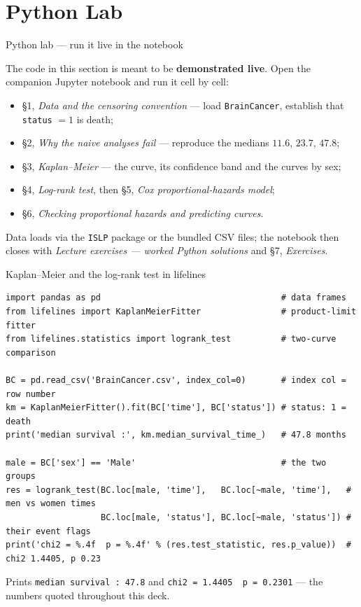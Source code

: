 \documentclass[aspectratio=169,11pt]{beamer}
\begin{document}
\section{Python Lab}

\begin{frame}{Python lab --- run it live in the notebook}
  \begin{labnote}
    The code in this section is meant to be \textbf{demonstrated live}. Open the companion
    Jupyter notebook and run it cell by cell:
    \begin{itemize}
      \item \S1, \emph{Data and the censoring convention} --- load \texttt{BrainCancer},
            establish that \texttt{status} $=1$ is death;
      \item \S2, \emph{Why the naive analyses fail} --- reproduce the medians
            $11.6$, $23.7$, $47.8$;
      \item \S3, \emph{Kaplan--Meier} --- the curve, its confidence band and the curves
            by sex;
      \item \S4, \emph{Log-rank test}, then \S5, \emph{Cox proportional-hazards model};
      \item \S6, \emph{Checking proportional hazards and predicting curves}.
    \end{itemize}
    Data loads via the \texttt{ISLP} package or the bundled CSV files; the notebook then
    closes with \emph{Lecture exercises --- worked Python solutions} and \S7,
    \emph{Exercises}.
  \end{labnote}
\end{frame}

\begin{frame}[fragile]{Kaplan--Meier and the log-rank test in lifelines}
  \begin{lstlisting}
import pandas as pd                                    # data frames
from lifelines import KaplanMeierFitter                # product-limit fitter
from lifelines.statistics import logrank_test          # two-curve comparison

BC = pd.read_csv('BrainCancer.csv', index_col=0)       # index col = row number
km = KaplanMeierFitter().fit(BC['time'], BC['status']) # status: 1 = death
print('median survival :', km.median_survival_time_)   # 47.8 months

male = BC['sex'] == 'Male'                             # the two groups
res = logrank_test(BC.loc[male, 'time'],   BC.loc[~male, 'time'],   # men vs women times
                   BC.loc[male, 'status'], BC.loc[~male, 'status']) # their event flags
print('chi2 = %.4f  p = %.4f' % (res.test_statistic, res.p_value))  # chi2 1.4405, p 0.23
  \end{lstlisting}
  \begin{takeaway}
    Prints \texttt{median survival : 47.8} and \texttt{chi2 = 1.4405\ \ p = 0.2301} ---
    the numbers quoted throughout this deck.
  \end{takeaway}
\end{frame}
\end{document}
